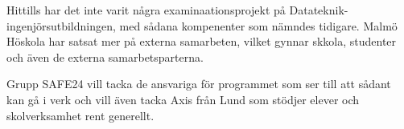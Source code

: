 
\begin{dedication} %

Hittills har det inte varit några examinaationsprojekt på Datateknik-ingenjörsutbildningen, med sådana kompenenter som nämndes tidigare. Malmö Höskola har satsat mer på externa samarbeten, vilket gynnar skkola, studenter och även de externa samarbetsparterna.

Grupp SAFE24 vill tacka de ansvariga för programmet som ser till att sådant kan gå i verk och vill även tacka Axis från Lund som stödjer elever och skolverksamhet rent generellt.

\end{dedication}

